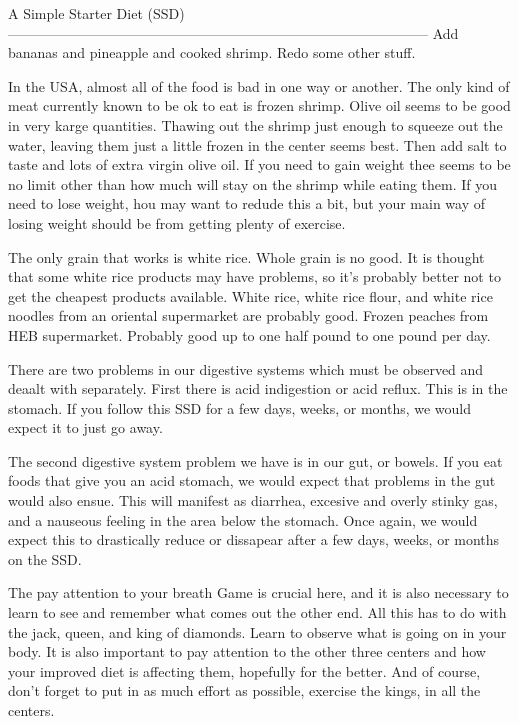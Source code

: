 \documentclass[12pt,letterpaper]{book}
\begin{document}
A Simple Starter Diet (SSD)
------------------------------------------------------------------------------------------
Add bananas and pineapple and cooked shrimp. Redo some other stuff.

In the USA, almost all of the food is bad in one way or another. The only kind of meat currently known to be ok to eat is frozen shrimp. Olive oil seems to be good in very karge quantities. Thawing out the shrimp just enough to squeeze out the water, leaving them just a little frozen in the center seems best. Then add salt to taste and lots of extra virgin olive oil. If you need to gain weight thee seems to be no limit other than how much will stay on the shrimp while eating them. If you need to lose weight, hou may want to redude this a bit, but your main way of losing weight should be from getting plenty of exercise.

The only grain that works is white rice. Whole grain is no good. It is thought that some white rice products may have problems, so it's probably better not to get the cheapest products available. White rice, white rice flour, and white rice noodles from an oriental supermarket are probably good. Frozen peaches from HEB supermarket. Probably good up to one half pound to one pound per day. 

There are two problems in our digestive systems which must be observed and deaalt with separately. First there is acid indigestion or acid reflux. This is in the stomach. If you follow this SSD for a few days, weeks, or months, we would expect it to just go away.

The second digestive system problem we have is in our gut, or bowels. If you eat foods that give you an acid stomach, we would expect that problems in the gut would also ensue. This will manifest as diarrhea, excesive and overly stinky gas, and a nauseous feeling in the area below the stomach. Once again, we would expect this to drastically reduce or dissapear after a few days, weeks, or months on the SSD.

The pay attention to your breath Game is crucial here, and it is also necessary to learn to see and remember what comes out the other end. All this has to do with the jack, queen, and king of diamonds. Learn to observe what is going on in your body. It is also important to pay attention to the other three centers and how your improved diet is affecting them, hopefully for the better. And of course, don't forget to put in as much effort as possible, exercise the kings, in all the centers.
\end{document}
